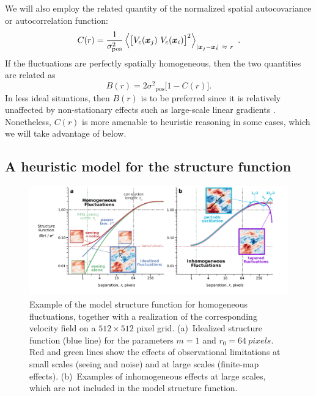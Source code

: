 \documentclass[fleqn,usenatbib, useAMS, a4paper]{mnras}
\newcommand\pos{\ensuremath{_{\mathrm{pos}}}}
\begin{document}
We will also employ the related quantity of the
normalized spatial autocovariance or autocorrelation function:
\begin{equation}
  \label{eq:autocovar}
  C(r) = \frac{1}{\sigma^2\pos}\left\langle 
  \bigl[
  V_{c}(\xx_j) \  V_{c}(\xx_i)
  \bigr]^{2} \right \rangle_{\Abs{\xx_j - \xx_i\!} \ \approx \ r} \ .
\end{equation}
If the fluctuations are perfectly spatially homogeneous, then the
two quantities are related \citep{1984ApJ...277..556S} as
\begin{equation}\label{eq:functional}
  B(r) = 2\sigma^2\pos \bigl[   1 - C(r)\bigr] .
\end{equation}
In less ideal situations, then \(B(r)\) is to be preferred since it is
relatively unaffected by non-stationary effects
such as large-scale linear gradients 
\citep{1984ApJ...277..556S}.
Nonetheless, \(C(r)\) is more amenable to heuristic reasoning in some cases,
which we will take advantage of below.


\subsection{A heuristic model for the structure function}
\label{sec:methods-apply}

\begin{figure}
 \centering
 \includegraphics[width=\linewidth]{Figures/model-strucfunc-annotated}\par
 \caption{
   Example of the model structure function for homogeneous fluctuations,
   together with a realization of the corresponding velocity field
   on a \(512 \times 512\) pixel grid.  
   (a)~Idealized structure function (blue line)
   for the parameters \(m = 1\) and \(r_0 = \SI{64}{pixels}\).
   Red and green lines show the effects of observational limitations
   at small scales (seeing and noise)
   and at large scales (finite-map effects).
   (b)~Examples of inhomogeneous effects at large scales,
   which are not included in the model structure function.
 }
 \label{fig:model-strucfunc}
\end{figure}
\end{document}
